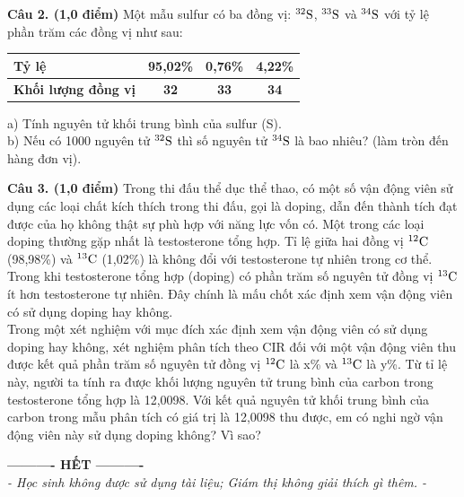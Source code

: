 \documentclass[11pt,a4paper]{article}
\begin{document}
\vspace{1pt}
\noindent
{}

\vspace{4pt}
\noindent
\textbf{Câu 2. (1,0 điểm)} Một mẫu sulfur có ba đồng vị: $^{32}\ce{S}$, $^{33}\ce{S}$ và $^{34}\ce{S}$ với tỷ lệ phần trăm các đồng vị như sau:
\begin{center}
\renewcommand{\arraystretch}{1.2}
\begin{tabular}{|l|c|c|c|}
\hline
\rowcolor{tableGreen}
\textbf{Tỷ lệ} & \textbf{95,02\%} & \textbf{0,76\%} & \textbf{4,22\%} \\
\hline
\textbf{Khối lượng đồng vị} & \textbf{32} & \textbf{33} & \textbf{34} \\
\hline
\end{tabular}
\end{center}
a) Tính nguyên tử khối trung bình của sulfur (S).\\
b) Nếu có 1000 nguyên tử $^{32}\ce{S}$ thì số nguyên tử $^{34}\ce{S}$ là bao nhiêu? (làm tròn đến hàng đơn vị).

\vspace{1pt}
\noindent
{}

\vspace{4pt}
\noindent
\textbf{Câu 3. (1,0 điểm)} Trong thi đấu thể dục thể thao, có một số vận động viên sử dụng các loại chất kích thích trong thi đấu, gọi là doping, dẫn đến thành tích đạt được của họ không thật sự phù hợp với năng lực vốn có. Một trong các loại doping thường gặp nhất là testosterone tổng hợp. Tỉ lệ giữa hai đồng vị $^{12}\ce{C}$ (98,98\%) và $^{13}\ce{C}$ (1,02\%) là không đổi với testosterone tự nhiên trong cơ thể. Trong khi testosterone tổng hợp (doping) có phần trăm số nguyên tử đồng vị $^{13}\ce{C}$ ít hơn testosterone tự nhiên. Đây chính là mấu chốt xác định xem vận động viên có sử dụng doping hay không.\\
Trong một xét nghiệm với mục đích xác định xem vận động viên có sử dụng doping hay không, xét nghiệm phân tích theo CIR đối với một vận động viên thu được kết quả phần trăm số nguyên tử đồng vị $^{12}\ce{C}$ là x\% và $^{13}\ce{C}$ là y\%. Từ tỉ lệ này, người ta tính ra được khối lượng nguyên tử trung bình của carbon trong testosterone tổng hợp là 12,0098. Với kết quả nguyên tử khối trung bình của carbon trong mẫu phân tích có giá trị là 12,0098 thu được, em có nghi ngờ vận động viên này sử dụng doping không? Vì sao?

\vspace{1pt}
\noindent
{}

\vspace{6pt}
\begin{center}
\textbf{\large ---------- HẾT ----------}\\
\textit{\small - Học sinh không được sử dụng tài liệu; Giám thị không giải thích gì thêm. -}
\end{center}
\end{document}
